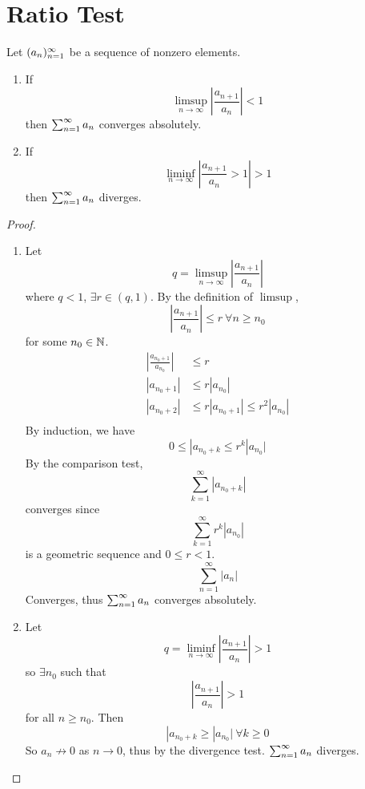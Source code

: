 \documentclass[openany]{report}
\begin{document}
\section{Ratio Test}
\begin{prop}
    Let $({a}_n)_{n=1}^\infty$ be a sequence of nonzero elements.
    \begin{enumerate}[label=(\roman*)]
        \item If 
        \[\limsup_{n \rightarrow \infty} \left| \frac{a_{n+1}}{a_n} \right|< 1\]
        then $\sum_{n=1}^\infty a_n$ converges absolutely.
        \item If 
        \[\liminf_{n\rightarrow \infty} \left| \frac{a_{n+1}}{a_n} > 1 \right| > 1\]
        then $\sum_{n=1}^\infty a_n$ diverges.
    \end{enumerate}
\end{prop}

\begin{proof}
    ~\newline
    \begin{enumerate}[label=(\roman*)]
        \item Let 
        \[q = \limsup_{n\rightarrow \infty} \left| \frac{a_{n+1}}{a_n} \right|\]
        where $q < 1$, $\exists r \in (q,1)$. By the definition of $\limsup$, 
        \[\left| \frac{a_{n+1}}{a_n} \right| \leq r \ \forall n \geq n_0\]
        for some $n_0 \in \mathbb{N}$.
        \begin{align*}
            \left| \frac{a_{n_0+1}}{a_{n_0}} \right| &\leq r\\
            \left| a_{n_0+1} \right| &\leq r|a_{n_0}|\\
            \left| a_{n_0+2} \right| &\leq r|a_{n_0+1}| \leq r^2|a_{n_0}|\\
        \end{align*}
        By induction, we have
        \[0 \leq |a_{n_0 + k} \leq r^k |a_{n_0}|\]
        By the comparison test, 
        \[\sum_{k=1}^\infty |a_{n_0+ k}|\]
        converges since 
        \[\sum_{k=1}^\infty r^k|a_{n_0}|\]
        is a geometric sequence and $0 \leq r < 1$. 
        \[\sum_{n=1}^\infty |a_n|\]
        Converges, thus $\sum_{n=1}^\infty a_n$ converges absolutely.
        \item Let 
        \[q = \liminf_{n \rightarrow \infty} \left| \frac{a_{n+1}}{a_n}\right| > 1\]
        so $\exists n_0$ such that 
        \[\left| \frac{a_{n+1}}{a_{n}} \right| > 1\]
        for all $n \geq n_0$. Then
        \[|a_{n_0 + k} \geq |a_{n_0}| \ \forall k \geq 0 \]
        So $a_n \not\rightarrow 0$ as $n \rightarrow 0$, thus by the divergence test. $\sum_{n=1}^\infty a_n$ diverges.
    \end{enumerate}
\end{proof}
\end{document}
